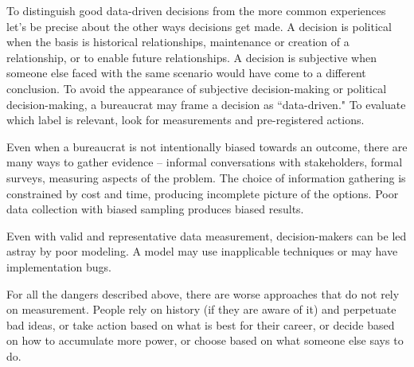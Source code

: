 To distinguish good data-driven decisions from the more common experiences let's be precise about the other ways decisions get made.
A decision is political when the basis is historical relationships, maintenance or creation of a relationship, or to enable future relationships. 
A decision is subjective when someone else faced with the same scenario would have come to a different conclusion. To avoid the appearance of subjective decision-making or political decision-making, a bureaucrat may frame a decision as ``data-driven." To evaluate which label is relevant, look for measurements and pre-registered actions. 


Even when a bureaucrat is not intentionally biased towards an outcome, there are many ways to gather evidence -- informal conversations with stakeholders, formal surveys, measuring aspects of the problem. The choice of information gathering is constrained by cost and time, producing incomplete picture of the options. Poor data collection with biased sampling produces biased results. 

Even with valid and representative data measurement, decision-makers can be led astray by poor modeling. A model may use inapplicable techniques or may have implementation bugs.

For all the dangers described above,
there are worse approaches that do not rely on measurement. People rely on history (if they are aware of it) and perpetuate bad ideas, or take action based on what is best for their career, or decide based on how to accumulate more power, or choose based on what someone else says to do.  

